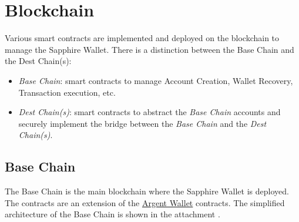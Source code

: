 \section{Blockchain}
\label{sec:blockchain}

Various smart contracts are implemented  and deployed on the blockchain to manage the Sapphire Wallet. There is a distinction between the Base Chain and the Dest Chain(s):
\begin{itemize}
    \item \textit{Base Chain}: smart contracts to manage Account Creation, Wallet Recovery, Transaction execution, etc.
    \item \textit{Dest Chain(s)}: smart contracts to abstract the \textit{Base Chain} accounts and securely implement the bridge between the \textit{Base Chain} and the \textit{Dest Chain(s)}. 
\end{itemize}

\subsection{Base Chain}
\label{subsec:base_chain}

The Base Chain is the main blockchain where the Sapphire Wallet is deployed. The contracts are an extension of the \hyperref[subsec:argent]{Argent Wallet} contracts. The simplified architecture of the Base Chain is shown in the attachment .

